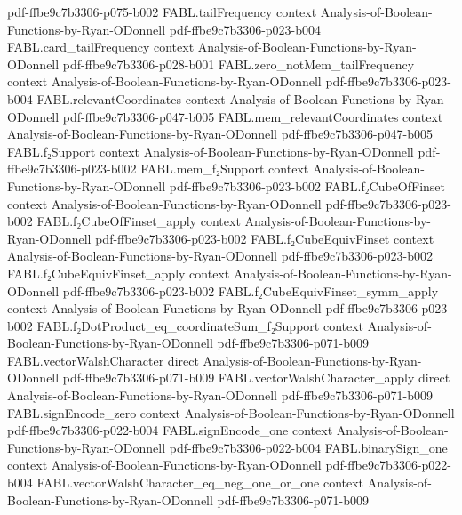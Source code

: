 \begin{theorem}
  {pdf-ffbe9c7b3306-p075-b002}
\proofstep
  {FABL.tailFrequency}
  {context}
  {Analysis-of-Boolean-Functions-by-Ryan-ODonnell}
  {pdf-ffbe9c7b3306-p023-b004}
\proofstep
  {FABL.card_tailFrequency}
  {context}
  {Analysis-of-Boolean-Functions-by-Ryan-ODonnell}
  {pdf-ffbe9c7b3306-p028-b001}
\proofstep
  {FABL.zero_notMem_tailFrequency}
  {context}
  {Analysis-of-Boolean-Functions-by-Ryan-ODonnell}
  {pdf-ffbe9c7b3306-p023-b004}
\proofstep
  {FABL.relevantCoordinates}
  {context}
  {Analysis-of-Boolean-Functions-by-Ryan-ODonnell}
  {pdf-ffbe9c7b3306-p047-b005}
\proofstep
  {FABL.mem_relevantCoordinates}
  {context}
  {Analysis-of-Boolean-Functions-by-Ryan-ODonnell}
  {pdf-ffbe9c7b3306-p047-b005}
\proofstep
  {FABL.f₂Support}
  {context}
  {Analysis-of-Boolean-Functions-by-Ryan-ODonnell}
  {pdf-ffbe9c7b3306-p023-b002}
\proofstep
  {FABL.mem_f₂Support}
  {context}
  {Analysis-of-Boolean-Functions-by-Ryan-ODonnell}
  {pdf-ffbe9c7b3306-p023-b002}
\proofstep
  {FABL.f₂CubeOfFinset}
  {context}
  {Analysis-of-Boolean-Functions-by-Ryan-ODonnell}
  {pdf-ffbe9c7b3306-p023-b002}
\proofstep
  {FABL.f₂CubeOfFinset_apply}
  {context}
  {Analysis-of-Boolean-Functions-by-Ryan-ODonnell}
  {pdf-ffbe9c7b3306-p023-b002}
\proofstep
  {FABL.f₂CubeEquivFinset}
  {context}
  {Analysis-of-Boolean-Functions-by-Ryan-ODonnell}
  {pdf-ffbe9c7b3306-p023-b002}
\proofstep
  {FABL.f₂CubeEquivFinset_apply}
  {context}
  {Analysis-of-Boolean-Functions-by-Ryan-ODonnell}
  {pdf-ffbe9c7b3306-p023-b002}
\proofstep
  {FABL.f₂CubeEquivFinset_symm_apply}
  {context}
  {Analysis-of-Boolean-Functions-by-Ryan-ODonnell}
  {pdf-ffbe9c7b3306-p023-b002}
\proofstep
  {FABL.f₂DotProduct_eq_coordinateSum_f₂Support}
  {context}
  {Analysis-of-Boolean-Functions-by-Ryan-ODonnell}
  {pdf-ffbe9c7b3306-p071-b009}
\proofstep
  {FABL.vectorWalshCharacter}
  {direct}
  {Analysis-of-Boolean-Functions-by-Ryan-ODonnell}
  {pdf-ffbe9c7b3306-p071-b009}
\proofstep
  {FABL.vectorWalshCharacter_apply}
  {direct}
  {Analysis-of-Boolean-Functions-by-Ryan-ODonnell}
  {pdf-ffbe9c7b3306-p071-b009}
\proofstep
  {FABL.signEncode_zero}
  {context}
  {Analysis-of-Boolean-Functions-by-Ryan-ODonnell}
  {pdf-ffbe9c7b3306-p022-b004}
\proofstep
  {FABL.signEncode_one}
  {context}
  {Analysis-of-Boolean-Functions-by-Ryan-ODonnell}
  {pdf-ffbe9c7b3306-p022-b004}
\proofstep
  {FABL.binarySign_one}
  {context}
  {Analysis-of-Boolean-Functions-by-Ryan-ODonnell}
  {pdf-ffbe9c7b3306-p022-b004}
\proofstep
  {FABL.vectorWalshCharacter_eq_neg_one_or_one}
  {context}
  {Analysis-of-Boolean-Functions-by-Ryan-ODonnell}
  {pdf-ffbe9c7b3306-p071-b009}

\end{theorem}
